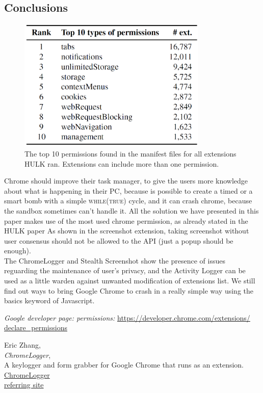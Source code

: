 \documentclass[12pt]{article}
\begin{document}
\begin{multicols}{2}
\section*{Conclusions}
\begin{figure}[H]
	\begin{center}
		\includegraphics[width=9cm]{permission.png}
		\caption{The top 10 permissions found in the manifest
			files for all extensions HULK ran. Extensions can include			
			more than one permission.}
	\end{center}
\end{figure}
Chrome should improve their task manager, to give the users more knowledge about what is happening in their PC, because is possible to create a timed or a smart bomb with a simple \textsc{while(true)} cycle, and it can crash chrome, because the sandbox sometimes can't handle it.
All the solution we have presented in this paper makes use of the most used chrome permission, as already stated in the HULK paper\cite{HULK}
As shown in the screenshot extension, taking screenshot without user consensus should not be allowed to the API (just a popup should be enough). \\
The ChromeLogger and Stealth Screenshot show the presence of issues reguarding the maintenance of user's privacy, and the Activity Logger can be used as a little warden against unwanted modification of extensions list. We still find out ways to bring Google Chrome to crash in a really simple way using the basics keyword of Javascript.\

\begin{thebibliography}{3}
	\emph{Google developer page: permissions:}
	\href{https://developer.chrome.com/extensions/declare_permissions}{https://developer.chrome.com/extensions/\\declare\_permissions}
	
	Eric Zhang,\\
	\emph{ChromeLogger},\\
A keylogger and form grabber for Google Chrome that runs as an extension.\\
\href{https://github.com/Xeroday/ChromeLogger}{ChromeLogger}\\
\href{https://www.ericzhang.me/projects/chromelogger/}{referring site}


\end{thebibliography}
\end{multicols}
\end{document}
